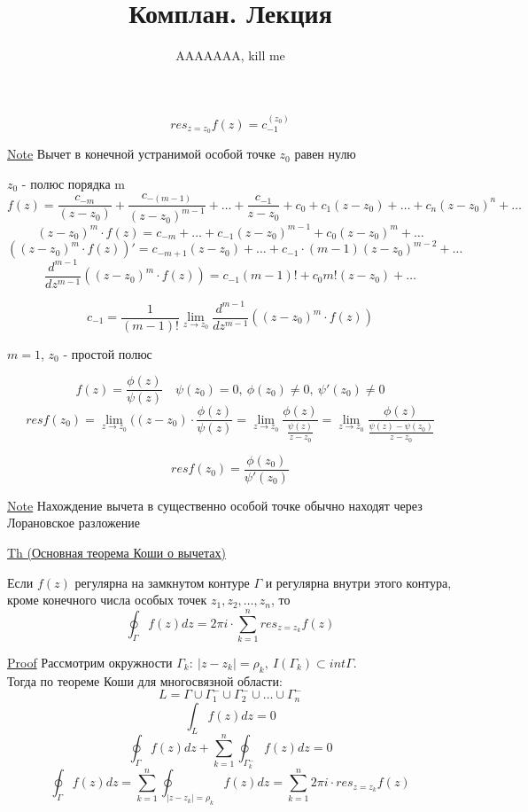 \documentclass[a4paper]{article}
\begin{document}
\title{Комплан. Лекция}
\author{AAAAAAA, kill me}
\maketitle
\[
    res_{z=z_0} f(z) = c_{-1}^{(z_0)}
\]

\begin{tcolorbox}
\underline{Note} Вычет в конечной устранимой особой точке $ z_0 $ равен нулю
\end{tcolorbox}

$ z_0 $ - полюс порядка m
\[
    f(z) = \frac{c_{-m}}{(z-z_0)} + \frac{c_{-(m-1)}}{(z-z_0)^{m-1}}
   + \dots + \frac{c_{-1}}{z- z_0} + c_0 + 
    c_1(z - z_0) + \dots + c_n(z-z_0)^{n}+ \dots
\]
\[
    (z - z_0)^{m} \cdot f(z) = c_{-m} + \dots + c_{-1} (z-z_0)^{m-1}+ c_0(z- z_0)^{m}
    + \dots
\]
\[
    ((z-z_0)^{m} \cdot f(z))' = c_{-m + 1} (z -z_0) + \dots  + c_{-1}\cdot(m-1)
    (z-z_0)^{m-2} + \dots
\]
\[
    \frac{d^{m-1}}{dz^{m-1}} ((z-z_0)^{m} \cdot f(z)) = c_{-1} (m-1)! + c_0
    m! (z-z_0) + \dots
\]
\begin{tcolorbox}
\[
    c_{-1} = \frac{1}{(m-1)!} \lim_{z \to z_0} \frac{d^{m-1}}{dz^{m-1}} ((z-z_0)^{m} \cdot f(z))
\]
\end{tcolorbox}

$ m = 1 $, $ z_0 $ - простой полюс

\[
    f(z) = \frac{\phi(z)}{\psi(z)}  \quad \psi(z_0) = 0, \ \phi(z_0) \neq 0, \ 
    \psi'(z_0) \neq 0
\]
\[
    res f(z_0) = \lim_{z \to z_0} ((z-z_0) \cdot \frac{\phi(z)}{\psi(z)} 
    = \lim_{z \to z_0} \frac{\phi(z)}{\frac{\psi(z)}{z-z_0} } =
    \lim_{z \to z_0} \frac{\phi(z)}{\frac{\psi(z) - \psi(z_0)}{z-z_0} } 
\]
\begin{tcolorbox}
\[
    res f(z_0) = \frac{\phi(z_0)}{\psi'(z_0)} 
\]
\end{tcolorbox}

\begin{tcolorbox}
\underline{Note}
Нахождение вычета в существенно особой точке обычно находят через Лорановское 
разложение
\end{tcolorbox}

\begin{tcolorbox}
\underline{Th (Основная теорема Коши о вычетах)}

Если $ f(z) $ регулярна на замкнутом контуре $ \Gamma $ и регулярна внутри
этого контура, кроме конечного числа особых точек $ z_1, z_2, \dots, z_n $, то
\[
    \oint_\Gamma f(z) dz = 2 \pi i \cdot \sum_{k=1}^{n} res_{z=z_k} f(z)
\]

\underline{Proof}
Рассмотрим окружности $ \Gamma_k: \ |z-z_k| = \rho_k, \ I(\Gamma_k) \subset int \Gamma $.\\
Тогда по теореме Коши для многосвязной области:
\[
    L = \Gamma \cup \Gamma_1^{-} \cup \Gamma_2^{-} \cup \dots \cup \Gamma_n^{-}
\]
\[
    \int_L f(z) dz = 0
\]
\[
    \oint_{\Gamma} f(z) dz + \sum_{k=1}^{n} \oint_{\Gamma_k^{-}} f(z) dz = 0 
\]
\[
    \oint_{\Gamma}f(z) dz = \sum_{k=1}^{n} \oint_{|z-z_k|=\rho_k} f(z) dz
    = \sum_{k=1}^{n} 2 \pi i \cdot res_{z=z_k} f(z)
\]
\end{tcolorbox}
\end{document}
